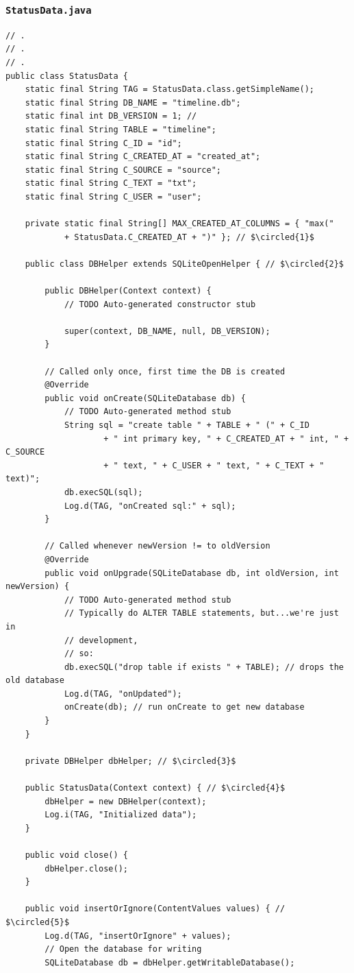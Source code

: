\begin{frame}
\frametitle{\texttt{StatusData.java}}
\lstset{language=java, style=eclipse, breaklines=true, tabsize=2}
\begin{lstlisting}[caption=src/com/artemisa/yamba/StatusData.java, basicstyle=\tiny,escapechar= $]
// .
// .
// .
public class StatusData {
	static final String TAG = StatusData.class.getSimpleName();
	static final String DB_NAME = "timeline.db";
	static final int DB_VERSION = 1; //
	static final String TABLE = "timeline";
	static final String C_ID = "id";
	static final String C_CREATED_AT = "created_at";
	static final String C_SOURCE = "source";
	static final String C_TEXT = "txt";
	static final String C_USER = "user";

	private static final String[] MAX_CREATED_AT_COLUMNS = { "max("
			+ StatusData.C_CREATED_AT + ")" }; // $\circled{1}$

	public class DBHelper extends SQLiteOpenHelper { // $\circled{2}$

		public DBHelper(Context context) {
			// TODO Auto-generated constructor stub

			super(context, DB_NAME, null, DB_VERSION);
		}

		// Called only once, first time the DB is created
		@Override
		public void onCreate(SQLiteDatabase db) {
			// TODO Auto-generated method stub
			String sql = "create table " + TABLE + " (" + C_ID
					+ " int primary key, " + C_CREATED_AT + " int, " + C_SOURCE
					+ " text, " + C_USER + " text, " + C_TEXT + " text)";
			db.execSQL(sql);
			Log.d(TAG, "onCreated sql:" + sql);
		}

		// Called whenever newVersion != to oldVersion
		@Override
		public void onUpgrade(SQLiteDatabase db, int oldVersion, int newVersion) {
			// TODO Auto-generated method stub
			// Typically do ALTER TABLE statements, but...we're just in
			// development,
			// so:
			db.execSQL("drop table if exists " + TABLE); // drops the old database
			Log.d(TAG, "onUpdated");
			onCreate(db); // run onCreate to get new database
		}
	}

	private DBHelper dbHelper; // $\circled{3}$

	public StatusData(Context context) { // $\circled{4}$
		dbHelper = new DBHelper(context);
		Log.i(TAG, "Initialized data");
	}

	public void close() {
		dbHelper.close();
	}

	public void insertOrIgnore(ContentValues values) { // $\circled{5}$
		Log.d(TAG, "insertOrIgnore" + values);
		// Open the database for writing
		SQLiteDatabase db = dbHelper.getWritableDatabase();


\end{lstlisting}
\end{frame}
